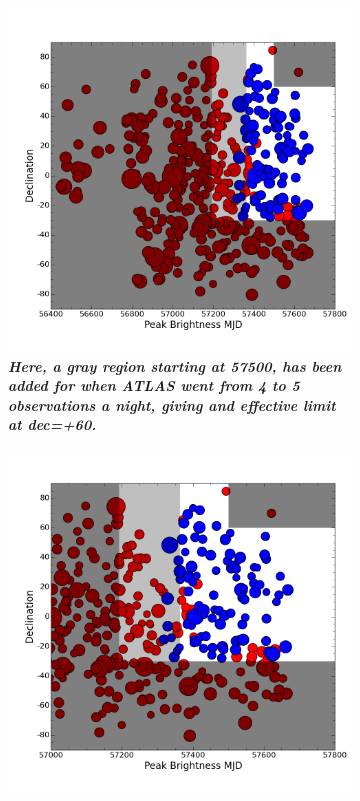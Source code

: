 \begin{figure}
	\centering
	\begin{subfigure}{.5\textwidth}
	  \centering
			\includegraphics[width=1\linewidth]{figures/variations/plot2useinPaper.png}
		\caption{\it \small{{\bf Here, a gray region starting at 57500, has been added for when ATLAS went from 4 to 5 observations a night, giving and effective limit at dec=+60\deg.}}}
		\label{fig:var5}
	\end{subfigure}%
	\begin{subfigure}{.5\textwidth}
	  \centering
			\includegraphics[width=1\linewidth]{figures/variations/plot2useinPaper_restrictx.png}

\end{subfigure}
\end{figure}
